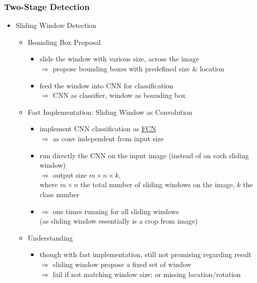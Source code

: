\subsubsection{Two-Stage Detection}
\begin{itemize}
\item Sliding Window Detection
	\begin{itemize}
	\item Bounding Box Proposal
		\begin{itemize}
		\item slide the window with various size, across the image \\
		$\Rightarrow$ propose bounding boxes with predefined size \& location
		\item feed the window into CNN for classification \\
		$\Rightarrow$ CNN as classifier, window as bounding box
		\end{itemize}
	\item Fast Implementation: Sliding Window as Convolution
		\begin{itemize}
		\item implement CNN classification as \hyperref[DL_Arch_FCN]{FCN} \\
		$\Rightarrow$ as conv independent from input size
		\item run directly the CNN on the input image (instead of on each sliding window) \\
		$\Rightarrow$ output size $m\times n \times k$, \\ 
		where $m\times n$ the total number of sliding windows on the image, $k$ the class number
		\item $\Rightarrow$ one times running for all sliding windows \\ 
		(as sliding window essentially is a crop from image)
		\end{itemize}
	\item Understanding
		\begin{itemize}
		\item though with fast implementation, still not promising regarding result \\
		$\Rightarrow$ sliding window propose a fixed set of window \\
		$\Rightarrow$ fail if not matching window size; or missing location/rotation
		\end{itemize}
	\end{itemize}


\end{itemize}
